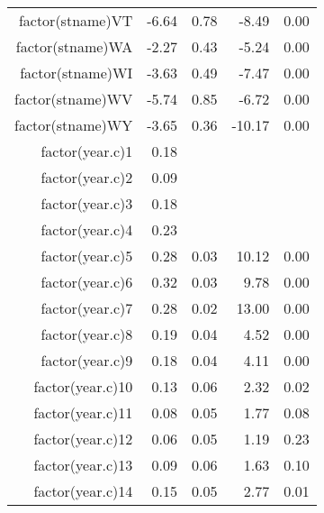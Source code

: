 \begin{table}[ht]
\begin{tabular}{rrrrr}
  factor(stname)VT & -6.64 & 0.78 & -8.49 & 0.00 \\ 
  factor(stname)WA & -2.27 & 0.43 & -5.24 & 0.00 \\ 
  factor(stname)WI & -3.63 & 0.49 & -7.47 & 0.00 \\ 
  factor(stname)WV & -5.74 & 0.85 & -6.72 & 0.00 \\ 
  factor(stname)WY & -3.65 & 0.36 & -10.17 & 0.00 \\ 
  factor(year.c)1 & 0.18 &  &  &  \\ 
  factor(year.c)2 & 0.09 &  &  &  \\ 
  factor(year.c)3 & 0.18 &  &  &  \\ 
  factor(year.c)4 & 0.23 &  &  &  \\ 
  factor(year.c)5 & 0.28 & 0.03 & 10.12 & 0.00 \\ 
  factor(year.c)6 & 0.32 & 0.03 & 9.78 & 0.00 \\ 
  factor(year.c)7 & 0.28 & 0.02 & 13.00 & 0.00 \\ 
  factor(year.c)8 & 0.19 & 0.04 & 4.52 & 0.00 \\ 
  factor(year.c)9 & 0.18 & 0.04 & 4.11 & 0.00 \\ 
  factor(year.c)10 & 0.13 & 0.06 & 2.32 & 0.02 \\ 
  factor(year.c)11 & 0.08 & 0.05 & 1.77 & 0.08 \\ 
  factor(year.c)12 & 0.06 & 0.05 & 1.19 & 0.23 \\ 
  factor(year.c)13 & 0.09 & 0.06 & 1.63 & 0.10 \\ 
  factor(year.c)14 & 0.15 & 0.05 & 2.77 & 0.01 \\ 
   \hline
\end{tabular}
\end{table}
